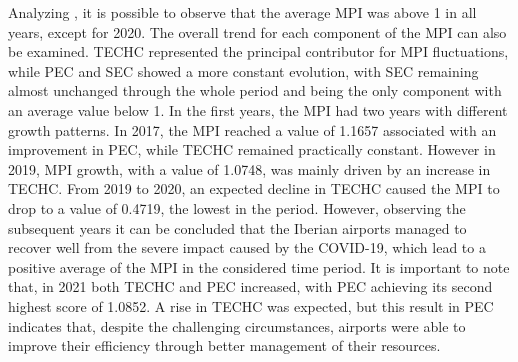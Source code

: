 Analyzing , it is possible to observe that the average MPI was above 1 in all years, except
for 2020. The overall trend for each component of the MPI can also be examined. TECHC represented
the principal contributor for MPI fluctuations, while PEC and SEC showed a more constant evolution,
with SEC remaining almost unchanged through the whole period and being the only component with an
average value below 1. In the first years, the MPI had two years with different growth patterns. In 2017, the MPI reached a
value of 1.1657 associated with an improvement in PEC, while TECHC remained practically constant.
However in 2019, MPI growth, with a value of 1.0748, was mainly driven by an increase in TECHC.
From 2019 to 2020, an expected decline in TECHC caused the MPI to drop to a value of 0.4719, the
lowest in the period. However, observing the subsequent years it can be concluded that the Iberian
airports managed to recover well from the severe impact caused by the COVID-19, which lead to a
positive average of the MPI in the considered time period. It is important to note that, in 2021 both
TECHC and PEC increased, with PEC achieving its second highest score of 1.0852. A rise in TECHC
was expected, but this result in PEC indicates that, despite the challenging circumstances, airports were
able to improve their efficiency through better management of their resources.

